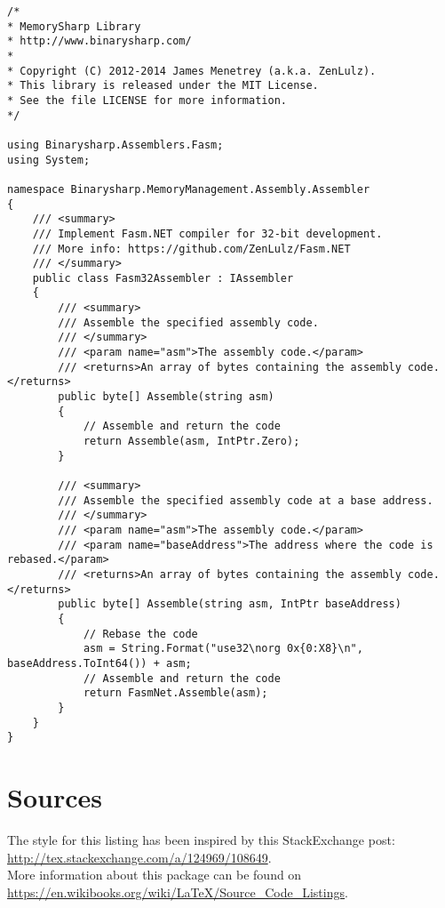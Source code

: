 \documentclass{article}
\begin{document}
	
	
\begin{lstlisting}[label=label-here,caption=Assembler implementation - MemorySharp]
/*
* MemorySharp Library
* http://www.binarysharp.com/
*
* Copyright (C) 2012-2014 James Menetrey (a.k.a. ZenLulz).
* This library is released under the MIT License.
* See the file LICENSE for more information.
*/

using Binarysharp.Assemblers.Fasm;
using System;

namespace Binarysharp.MemoryManagement.Assembly.Assembler
{
	/// <summary>
	/// Implement Fasm.NET compiler for 32-bit development.
	/// More info: https://github.com/ZenLulz/Fasm.NET
	/// </summary>
	public class Fasm32Assembler : IAssembler
	{
		/// <summary>
		/// Assemble the specified assembly code.
		/// </summary>
		/// <param name="asm">The assembly code.</param>
		/// <returns>An array of bytes containing the assembly code.</returns>
		public byte[] Assemble(string asm)
		{
			// Assemble and return the code
			return Assemble(asm, IntPtr.Zero);
		}
		
		/// <summary>
		/// Assemble the specified assembly code at a base address.
		/// </summary>
		/// <param name="asm">The assembly code.</param>
		/// <param name="baseAddress">The address where the code is rebased.</param>
		/// <returns>An array of bytes containing the assembly code.</returns>
		public byte[] Assemble(string asm, IntPtr baseAddress)
		{
			// Rebase the code
			asm = String.Format("use32\norg 0x{0:X8}\n", baseAddress.ToInt64()) + asm;
			// Assemble and return the code
			return FasmNet.Assemble(asm);
		}
	}
}
\end{lstlisting}

\section*{Sources}

The style for this listing has been inspired by this StackExchange post: \url{http://tex.stackexchange.com/a/124969/108649}. \\

More information about this package can be found on \url{https://en.wikibooks.org/wiki/LaTeX/Source_Code_Listings}.
	
\end{document}
